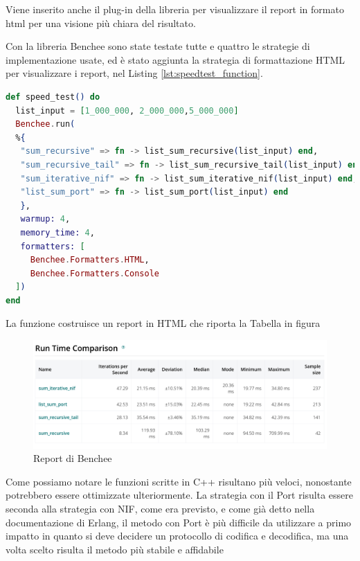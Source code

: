 Viene inserito anche il plug-in della libreria
per visualizzare il report in formato html per
una visione più chiara del risultato.

Con la libreria Benchee sono state testate tutte e quattro le
strategie di implementazione usate, ed è stato aggiunta la strategia
di formattazione HTML per visualizzare i report, nel Listing \ref{lst:speedtest_function}.
 

\begin{lstlisting}[language=elixir,captionpos=b,
	caption={Funzione speed\_test()},
	label={lst:speedtest_function}]
def speed_test() do
  list_input = [1_000_000, 2_000_000,5_000_000]
  Benchee.run(
  %{
   "sum_recursive" => fn -> list_sum_recursive(list_input) end,
   "sum_recursive_tail" => fn -> list_sum_recursive_tail(list_input) end,
   "sum_iterative_nif" => fn -> list_sum_iterative_nif(list_input) end,
   "list_sum_port" => fn -> list_sum_port(list_input) end
   },
   warmup: 4,
   memory_time: 4,
   formatters: [
     Benchee.Formatters.HTML,
     Benchee.Formatters.Console
  ])
end
\end{lstlisting}

La funzione costruisce un report in HTML che riporta la Tabella
in figura

\begin{figure}[!htp]
    \centering
    \includegraphics[keepaspectratio=true,scale=0.21]{images/tab_report.png}
	\caption{Report di Benchee}
  	\label{fig:report_tab_interoperabilita}
\end{figure}

Come possiamo notare le funzioni scritte in C++ risultano più veloci, nonostante
potrebbero essere ottimizzate ulteriormente. La strategia con il Port risulta
essere seconda alla strategia con NIF, come era previsto, e come
già detto nella documentazione di Erlang, il metodo con Port è più difficile
da utilizzare a primo impatto in quanto si deve decidere un protocollo di
codifica e decodifica, ma una volta scelto risulta il metodo più stabile
e affidabile 


